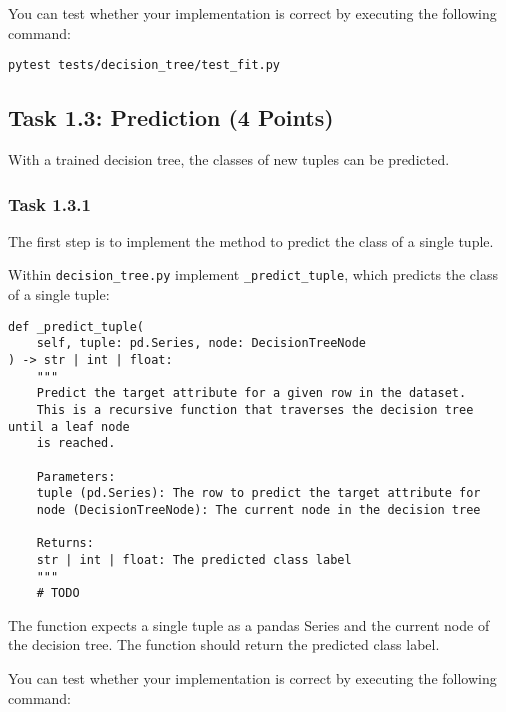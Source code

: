 \documentclass[
english,
smallborders
]{i6prcsht}
\newcommand{\points}[1]{\hfill \color{red}(#1 Points)\color{black}}
\begin{document}
You can test whether your implementation is correct by executing the following command:

\vspace*{0.3cm}

\begin{lstlisting}
pytest tests/decision_tree/test_fit.py
\end{lstlisting}

\vspace*{0.1cm}

\subsection*{Task 1.3: Prediction \points{4}}

With a trained decision tree, the classes of new tuples can be predicted.

\subsubsection*{Task 1.3.1}

The first step is to implement the method to predict the class of a single tuple.

Within \texttt{decision\_tree.py} implement \texttt{\_predict\_tuple}, which predicts the class of a single tuple:

\vspace*{0.3cm}

\newpage

\begin{lstlisting}
def _predict_tuple(
	self, tuple: pd.Series, node: DecisionTreeNode
) -> str | int | float:
	"""
	Predict the target attribute for a given row in the dataset.
	This is a recursive function that traverses the decision tree until a leaf node
	is reached.

	Parameters:
	tuple (pd.Series): The row to predict the target attribute for
	node (DecisionTreeNode): The current node in the decision tree

	Returns:
	str | int | float: The predicted class label
	"""
	# TODO
\end{lstlisting}

\vspace*{0.1cm}

The function expects a single tuple as a pandas Series and the current node of the decision tree. The function should return the predicted class label.

You can test whether your implementation is correct by executing the following command:
\end{document}
